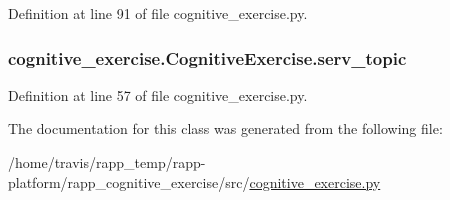Definition at line 91 of file cognitive\-\_\-exercise.\-py.

\hypertarget{classcognitive__exercise_1_1CognitiveExercise_a01c12d3ff9258c812e34f89a516699ed}{
\subsubsection[{serv\-\_\-topic}]{\setlength{\rightskip}{0pt plus 5cm}cognitive\-\_\-exercise.\-Cognitive\-Exercise.\-serv\-\_\-topic}}\label{classcognitive__exercise_1_1CognitiveExercise_a01c12d3ff9258c812e34f89a516699ed}


Definition at line 57 of file cognitive\-\_\-exercise.\-py.



The documentation for this class was generated from the following file\-:\begin{DoxyCompactItemize}
\item 
/home/travis/rapp\-\_\-temp/rapp-\/platform/rapp\-\_\-cognitive\-\_\-exercise/src/\hyperlink{cognitive__exercise_8py}{cognitive\-\_\-exercise.\-py}\end{DoxyCompactItemize}
